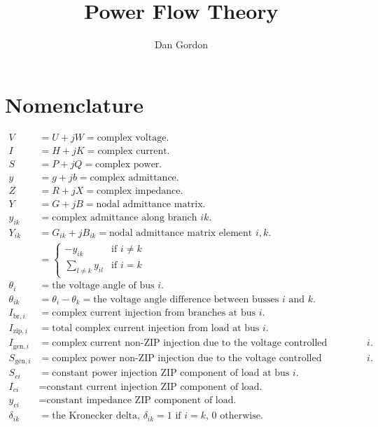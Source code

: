 \documentclass[11pt]{article}
\title{Power Flow Theory}
\author{Dan Gordon}
\date{}
\newcommand{\Vr}{\ensuremath{U}}
\newcommand{\Ir}{\ensuremath{H}}
\newcommand{\Ii}{\ensuremath{K}}
\begin{document}
\maketitle

\section{Nomenclature}
\begin{align*}
V &= \Vr + jW = \text{complex voltage.} \\
I &= \Ir + j\Ii = \text{complex current.} \\
S &= P + jQ = \text{complex power.} \\
y &= g + jb = \text{complex admittance.} \\
Z &= R + jX = \text{complex impedance.} \\
Y &= G + jB = \text{nodal admittance matrix.} \\
y_{ik} &= \text{complex admittance along branch $ik$.} \\
Y_{ik} &= G_{ik} + jB_{ik} = \text{nodal admittance matrix element $i, k$.} \\
&= 
	\begin{cases}
		-y_{ik}&\text{if $i \ne k$} \\
		\sum_{l \ne k} y_{il}& \text{if $i = k$}
	\end{cases} \\
\theta_{i} &= \text{the voltage angle of bus $i$.} \\
\theta_{ik} &= \theta_i - \theta_k = \text{the voltage angle difference between busses $i$ and $k$.} \\
I_{\text{br},i} &= \text{complex current injection from branches at bus $i$.} \\
I_{\text{zip},i} &= \text{total complex current injection from load at bus $i$.} \\
I_{\text{gen},i} &= \text{complex current non-ZIP injection due to the voltage controlled generation at bus $i$.} \\
S_{\text{gen},i} &= \text{complex power non-ZIP injection due to the voltage controlled generation at bus $i$.} \\
S_{ci} &= \text{constant power injection ZIP component of load at bus $i$.} \\
I_{ci} &= \text{constant current injection ZIP component of load.} \\
y_{ci} &= \text{constant impedance ZIP component of load.} \\
\delta_{ik} &= \text{the Kronecker delta, $\delta_{ik} = 1$ if $i = k$, 0 otherwise.}
\end{align*}
\end{document}
